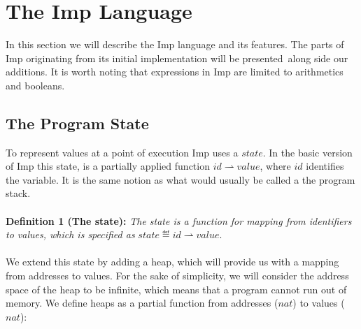 \section{The Imp Language}
\label{sec:background_imp}
In this section we will describe the Imp language and its features. The parts of Imp originating from its initial implementation will be presented\,\cite{Pierce:SF} along side our additions. It is worth noting that expressions in Imp are limited to arithmetics and booleans.

\subsection{The Program State}
To represent values at a point of execution Imp uses a $state$. In the basic version of Imp this state, is a partially applied function $id \rightharpoonup value$, where $id$ identifies the variable. It is the same notion as what would usually be called a the program stack.

\paragraph{}
\textbf{Definition 1 (The state):} \textit{The state is a function for mapping from identifiers to values, which is specified as }$state \eqdef id \rightharpoonup value.$

\paragraph{}
We extend this state by adding a heap, which will provide us with a mapping from addresses to values. For the sake of simplicity, we will consider the address space of the heap to be infinite, which means that a program cannot run out of memory. We define heaps as a partial function from addresses ($nat$) to values ($nat$):

